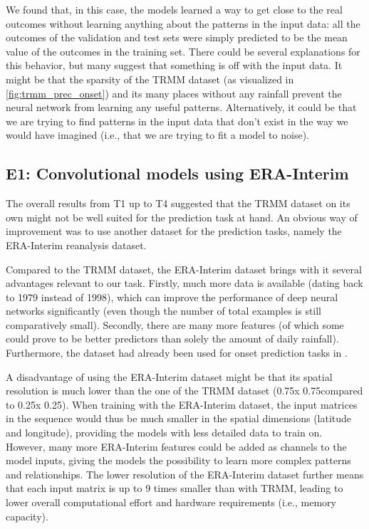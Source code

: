 We found that, in this case, the models learned a way to get close to the real outcomes without learning anything about the patterns in the input data: all the outcomes of the validation and test sets were simply predicted to be the mean value of the outcomes in the training set. There could be several explanations for this behavior, but many suggest that something is off with the input data. It might be that the sparsity of the TRMM dataset (as visualized in \cref{fig:trmm_prec_onset}) and its many places without any rainfall prevent the neural network from learning any useful patterns. Alternatively, it could be that we are trying to find patterns in the input data that don't exist in the way we would have imagined (i.e., that we are trying to fit a model to noise).

\clearpage
\subsection{E1: Convolutional models using ERA-Interim}
\label{sst:nn_e1}
The overall results from T1 up to T4 suggested that the TRMM dataset on its own might not be well suited for the prediction task at hand. An obvious way of improvement was to use another dataset for the prediction tasks, namely the ERA-Interim reanalysis dataset.

Compared to the TRMM dataset, the ERA-Interim dataset brings with it several advantages relevant to our task. Firstly, much more data is available (dating back to 1979 instead of 1998), which can improve the performance of deep neural networks significantly (even though the number of total examples is still comparatively small). Secondly, there are many more features (of which some could prove to be better predictors than solely the amount of daily rainfall). Furthermore, the dataset had already been used for onset prediction tasks in \citep{Stolbova.2015}.

A disadvantage of using the ERA-Interim dataset might be that its spatial resolution is much lower than the one of the TRMM dataset (0.75\degree x 0.75\degree compared to 0.25\degree x 0.25\degree). When training with the ERA-Interim dataset, the input matrices in the sequence would thus be much smaller in the spatial dimensions (latitude and longitude), providing the models with less detailed data to train on. However, many more ERA-Interim features could be added as channels to the model inputs, giving the models the possibility to learn more complex patterns and relationships. The lower resolution of the ERA-Interim dataset further means that each input matrix is up to 9 times smaller than with TRMM, leading to lower overall computational effort and hardware requirements (i.e., memory capacity).

